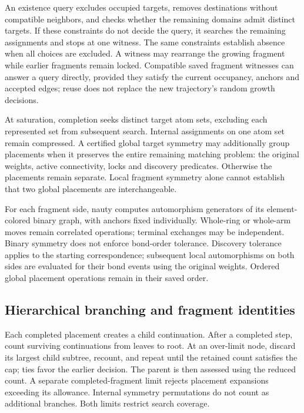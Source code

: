 An existence query excludes occupied targets, removes destinations without compatible neighbors, and checks whether the remaining domains admit distinct targets. If these constraints do not decide the query, it searches the remaining assignments and stops at one witness. The same constraints establish absence when all choices are excluded. A witness may rearrange the growing fragment while earlier fragments remain locked. Compatible saved fragment witnesses can answer a query directly, provided they satisfy the current occupancy, anchors and accepted edges; reuse does not replace the new trajectory's random growth decisions.

\label{sec:completion-details}
At saturation, completion seeks distinct target atom sets, excluding each represented set from subsequent search. Internal assignments on one atom set remain compressed. A certified global target symmetry may additionally group placements when it preserves the entire remaining matching problem: the original weights, active connectivity, locks and discovery predicates. Otherwise the placements remain separate. Local fragment symmetry alone cannot establish that two global placements are interchangeable.

For each fragment side, nauty computes automorphism generators of its element-colored binary graph, with anchors fixed individually. Whole-ring or whole-arm moves remain correlated operations; terminal exchanges may be independent. Binary symmetry does not enforce bond-order tolerance. Discovery tolerance applies to the starting correspondence; subsequent local automorphisms on both sides are evaluated for their bond events using the original weights. Ordered global placement operations remain in their saved order.

\subsection{Hierarchical branching and fragment identities}
\label{sec:hierarchy-details}

Each completed placement creates a child continuation. After a completed step, count surviving continuations from leaves to root. At an over-limit node, discard its largest child subtree, recount, and repeat until the retained count satisfies the cap; ties favor the earlier decision. The parent is then assessed using the reduced count. A separate completed-fragment limit rejects placement expansions exceeding its allowance. Internal symmetry permutations do not count as additional branches. Both limits restrict search coverage.

